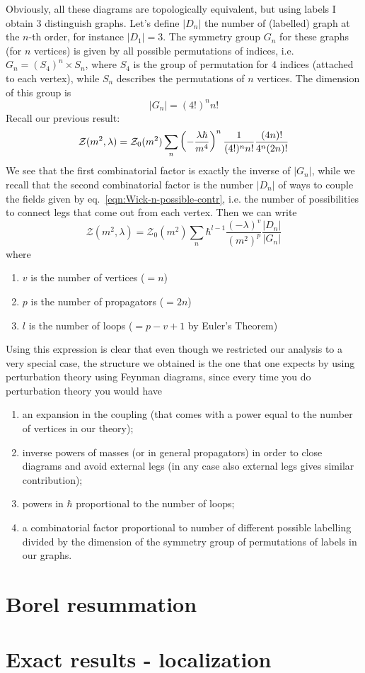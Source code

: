 \documentclass[../main/main.tex]{subfiles}
\begin{document}
Obviously, all these diagrams are topologically equivalent, but using labels I obtain 3 distinguish graphs. Let's define $|D_n|$ the number of (labelled) graph at the $n$-th order, for instance $|D_1|=3$.
The symmetry group $G_n$ for these graphs (for $n$ vertices) is given by all possible permutations of indices, i.e. $G_n=(S_4)^n\times S_n$, where $S_4$ is the group of permutation for 4 indices (attached to each vertex), while $S_n$ describes the permutations of $n$ vertices. The dimension of this group is 
\[|G_n|=(4!)^nn!\]
Recall our previous result:
\[\mathcal Z(m^2,\lambda)=\mathcal Z_0(m^2)\sum_n\left(-\frac{\lambda\hbar}{m^4}\right)^n\frac1{(4!)^nn!}\frac{(4n)!}{4^n(2n)!}\]
We see that the first combinatorial factor is exactly the inverse of $|G_n|$, while we recall that the second combinatorial factor is the number $|D_n|$ of ways to couple the fields given by eq.~\eqref{eqn:Wick-n-possible-contr}, i.e. the number of possibilities to connect  legs that come out from each vertex. Then we can write
\[\mathcal Z(m^2,\lambda)=\mathcal Z_0(m^2)\sum_n\hbar^{l-1}\frac{(-\lambda)^v}{(m^2)^p}\frac{|D_n|}{|G_n|}\]
where
\begin{enumerate}[label=\textbullet]
\item $v$ is the number of vertices ($=n$)
\item $p$ is the number of propagators ($=2n$)
\item $l$ is the number of loops ($=p-v+1$ by Euler's Theorem)
\end{enumerate}
Using this expression is clear that even though we restricted our analysis to a very special case, the structure we obtained is the one that one expects by using perturbation theory using Feynman diagrams, since every time you do perturbation theory you would have
\begin{enumerate}[label=\textbullet]
\item an expansion in the coupling (that comes with a power equal to the number of vertices in our theory);
\item inverse powers of masses (or in general propagators) in order to close diagrams and avoid external legs (in any case also external legs gives similar contribution);
\item powers in $\hbar$ proportional to the number of loops;
\item a combinatorial factor proportional to number of different possible labelling divided by the dimension of the symmetry group of permutations of labels in our graphs.
\end{enumerate}



\section{Borel resummation}
\section{Exact results - localization}
\end{document}

